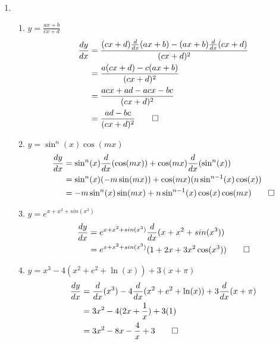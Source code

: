 \documentclass[12pt, a4paper]{article}
\begin{document}
\begin{enumerate}[Q\arabic*.]
  \item \begin{enumerate}[(\alph*)]
      \item $\displaystyle y = \frac{ax+b}{cx+d}$
        \begin{align*}
          \frac{dy}{dx} &= \frac{(cx+d)\frac{d}{dx}(ax+b) - (ax+b)\frac{d}{dx}(cx+d)}{(cx+d)^2}\\
                        &= \frac{a(cx+d) - c(ax+b)}{(cx+d)^2} \\
                        &= \frac{acx + ad - acx - bc}{(cx+d)^2}\\
                        &= \frac{ad-bc}{(cx+d)^2} \qed
        \end{align*}

      \item $\displaystyle y = \sin^n(x)\cos(mx)$
        \begin{align*}
          \frac{dy}{dx} &= \sin^n(x)\frac{d}{dx}(\cos(mx)) + \cos(mx)\frac{d}{dx}(\sin^n(x)) \\
                        &= \sin^n(x)(-m\sin(mx)) + \cos(mx)(n\sin^{n-1}(x)\cos(x)) \\
                        &= -m\sin^n(x)\sin(mx) + n\sin^{n-1}(x)\cos(x)\cos(mx) \qed
        \end{align*}

      \item $\displaystyle y = e^{x+x^2+sin(x^3)}$
        \begin{align*}
                    \frac{dy}{dx} &= e^{x+x^2+sin(x^3)}\frac{d}{dx}(x + x^2 + sin(x^3)) \\
                        &= e^{x+x^2+sin(x^3)}(1 + 2x + 3x^2\cos(x^3)) \qed
        \end{align*}

      \item $\displaystyle y = x^3-4(x^2+e^2+\ln(x)) + 3(x+\pi)$
        \begin{align*}
          \frac{dy}{dx} &= \frac{d}{dx}(x^3) -4\frac{d}{dx}(x^2+e^2+\ln(x)) + 3\frac{d}{dx}(x+\pi) \\
                        &= 3x^2 - 4(2x+\frac{1}{x}) + 3(1) \\
                        &= 3x^2 - 8x -\frac{4}{x} + 3 \qed
        \end{align*}


\end{enumerate}
\end{enumerate}
\end{document}
